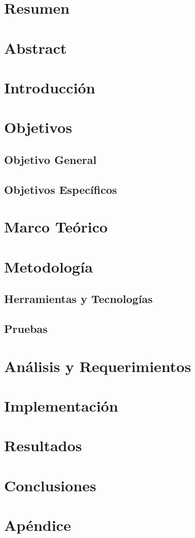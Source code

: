 \documentclass[12pt]{article}
\begin{document}
\begin{doublespace}
\doublespacing
\section{Resumen}
\section{Abstract}
\section{Introducción}
\section{Objetivos}
\subsection{Objetivo General}
\subsection{Objetivos Específicos}

\section{Marco Teórico}

\section{Metodología}

\subsection{Herramientas y Tecnologías}

\subsection{Pruebas}

\section{Análisis y Requerimientos}

\section{Implementación}

\section{Resultados}

\section{Conclusiones}



\end{doublespace}
\printbibliography
\appendix
\section{Apéndice}

\end{document}
